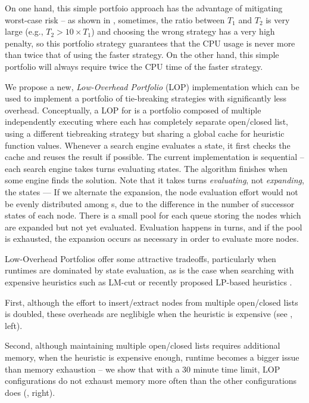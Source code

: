 On one hand, this simple portfoio approach has the advantage of mitigating worst-case risk -- as shown in , sometimes, the ratio between $T_1$ and $T_2$ is very large (e.g., $T_2 > 10\times T_1$) and choosing the wrong strategy has a very high penalty, so this portfolio strategy guarantees that the CPU usage is never more than twice that of using the faster strategy.
On the other hand, this simple portfolio will always require twice the
CPU time of the faster strategy.

We propose a new, \emph{Low-Overhead Portfolio} (LOP) implementation which can be used to implement a portfolio of tie-breaking strategies with significantly less overhead.
% 
Conceptually, a LOP for \astar is a portfolio composed of multiple
independently executing \astar where each \astar has completely separate
open/closed list, using a different tiebreaking strategy but sharing a
global cache for heuristic function values. Whenever a search engine
evaluates a state, it first checks the cache and reuses the result if
possible.  The current implementation is sequential -- each search
engine takes turns evaluating states. The algorithm finishes when some
engine finds the solution. Note that it takes turns \emph{evaluating}, not
\emph{expanding}, the states --- If we alternate the expansion, 
the node evaluation effort would not be evenly
distributed among \astar{}s, due to the difference in the number of
successor states of each node. There is a small pool for each queue
storing the nodes which are expanded
but not yet evaluated. Evaluation happens in turns, and if the pool is
exhausted, the expansion occurs as necessary in order to evaluate
more nodes.

Low-Overhead Portfolios offer some attractive tradeoffs,
particularly when runtimes are dominated by state evaluation, as is the case when searching with 
expensive heuristics such as LM-cut or recently proposed LP-based heuristics \cite{PommereningRHB14,ImaiF14}.

First, although the effort to insert/extract nodes from multiple
open/closed lists is doubled, these overheads are neglibigle when the
heuristic is expensive (see , left).

Second, although maintaining multiple open/closed lists requires additional memory,
when the heuristic is expensive enough, runtime becomes a bigger issue
than memory exhaustion  -- we show that with a 30 minute time limit, LOP
configurations do not exhaust memory more often than the other
configurations does (, right).


